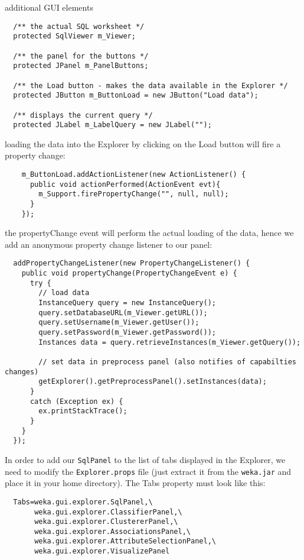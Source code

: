 \begin{tight_itemize}
  \newpage
  \item additional GUI elements
  \begin{verbatim}
  /** the actual SQL worksheet */
  protected SqlViewer m_Viewer;

  /** the panel for the buttons */
  protected JPanel m_PanelButtons;

  /** the Load button - makes the data available in the Explorer */
  protected JButton m_ButtonLoad = new JButton("Load data");

  /** displays the current query */
  protected JLabel m_LabelQuery = new JLabel("");
  \end{verbatim}

  \item loading the data into the Explorer by clicking on the Load button
will fire a property change:
  \begin{verbatim}
    m_ButtonLoad.addActionListener(new ActionListener() {
      public void actionPerformed(ActionEvent evt){
        m_Support.firePropertyChange("", null, null);
      }
    });
  \end{verbatim}

  \item the propertyChange event will perform the actual loading of the data,
hence we add an anonymous property change listener to our panel:
  \begin{verbatim}
  addPropertyChangeListener(new PropertyChangeListener() {
    public void propertyChange(PropertyChangeEvent e) {
      try {
        // load data
        InstanceQuery query = new InstanceQuery();
        query.setDatabaseURL(m_Viewer.getURL());
        query.setUsername(m_Viewer.getUser());
        query.setPassword(m_Viewer.getPassword());
        Instances data = query.retrieveInstances(m_Viewer.getQuery());

        // set data in preprocess panel (also notifies of capabilties changes)
        getExplorer().getPreprocessPanel().setInstances(data);
      }
      catch (Exception ex) {
        ex.printStackTrace();
      }
    }
  });
  \end{verbatim}

  \item In order to add our \texttt{SqlPanel} to the list of tabs displayed in
the Explorer, we need to modify the \texttt{Explorer.props} file (just extract
it from the \texttt{weka.jar} and place it in your home directory). The Tabs
property must look like this:
  \begin{verbatim}
  Tabs=weka.gui.explorer.SqlPanel,\
       weka.gui.explorer.ClassifierPanel,\
       weka.gui.explorer.ClustererPanel,\
       weka.gui.explorer.AssociationsPanel,\
       weka.gui.explorer.AttributeSelectionPanel,\
       weka.gui.explorer.VisualizePanel
  \end{verbatim}
\end{tight_itemize}

